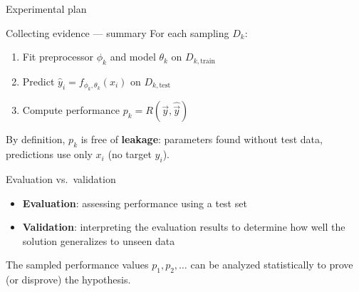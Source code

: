 \begin{frame}{Experimental plan}
{
  }
\end{frame}

\begin{frame}{Collecting evidence --- summary}
  For each sampling $D_k$:
  \begin{enumerate}
    \item Fit preprocessor $\phi_k$ and model $\theta_k$ on $D_{k,\text{train}}$
    \item Predict $\hat{y}_i = f_{\phi_k, \theta_k}(x_i)$ on $D_{k,\text{test}}$
    \item Compute performance $p_k = R(\vec{y}, \hat{\vec{y}})$
  \end{enumerate}

  \vspace{0.3cm}
  By definition, $p_k$ is free of \textbf{leakage}: parameters found without
  test data, predictions use only $x_i$ (no target $y_i$).
\end{frame}

\begin{frame}{Evaluation vs.\ validation}
  \begin{itemize}
    \item \textbf{Evaluation}: assessing performance using a test set
    \item \textbf{Validation}: interpreting the evaluation results to determine
      how well the solution generalizes to unseen data
  \end{itemize}

  \vspace{0.3cm}
  The sampled performance values $p_1, p_2, \ldots$ can be analyzed
  statistically to prove (or disprove) the hypothesis.
\end{frame}

